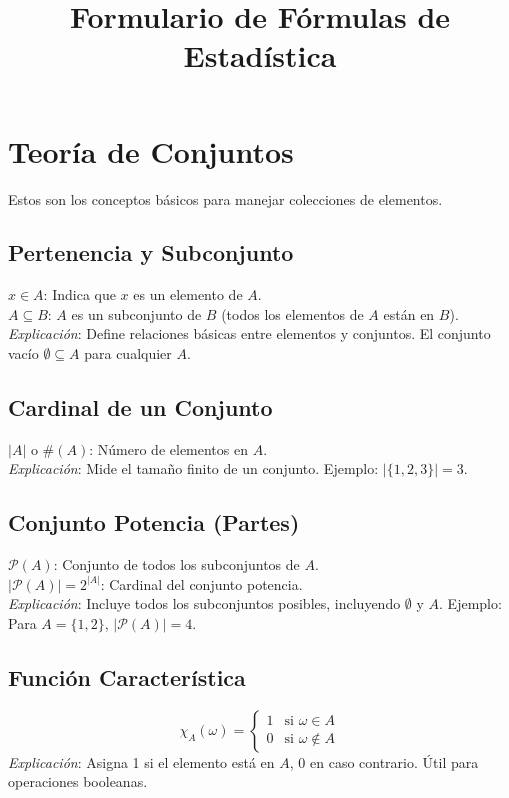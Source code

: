 \documentclass{article}
\title{Formulario de Fórmulas de Estadística}
\date{}
\begin{document}
\maketitle

\section{Teoría de Conjuntos}
Estos son los conceptos básicos para manejar colecciones de elementos.

\subsection{Pertenencia y Subconjunto}
\( x \in A \): Indica que \( x \) es un elemento de \( A \). \\
\( A \subseteq B \): \( A \) es un subconjunto de \( B \) (todos los elementos de \( A \) están en \( B \)). \\
\textit{Explicación}: Define relaciones básicas entre elementos y conjuntos. El conjunto vacío \( \emptyset \subseteq A \) para cualquier \( A \).

\subsection{Cardinal de un Conjunto}
\( |A| \) o \( \#(A) \): Número de elementos en \( A \). \\
\textit{Explicación}: Mide el tamaño finito de un conjunto. Ejemplo: \( |\{1, 2, 3\}| = 3 \).

\subsection{Conjunto Potencia (Partes)}
\( \mathcal{P}(A) \): Conjunto de todos los subconjuntos de \( A \). \\
\( |\mathcal{P}(A)| = 2^{|A|} \): Cardinal del conjunto potencia. \\
\textit{Explicación}: Incluye todos los subconjuntos posibles, incluyendo \( \emptyset \) y \( A \). Ejemplo: Para \( A = \{1, 2\} \), \( |\mathcal{P}(A)| = 4 \).

\subsection{Función Característica}
\[
\chi_A(\omega) = 
\begin{cases} 
1 & \text{si } \omega \in A \\ 
0 & \text{si } \omega \notin A 
\end{cases}
\]
\textit{Explicación}: Asigna 1 si el elemento está en \( A \), 0 en caso contrario. Útil para operaciones booleanas.
\end{document}
